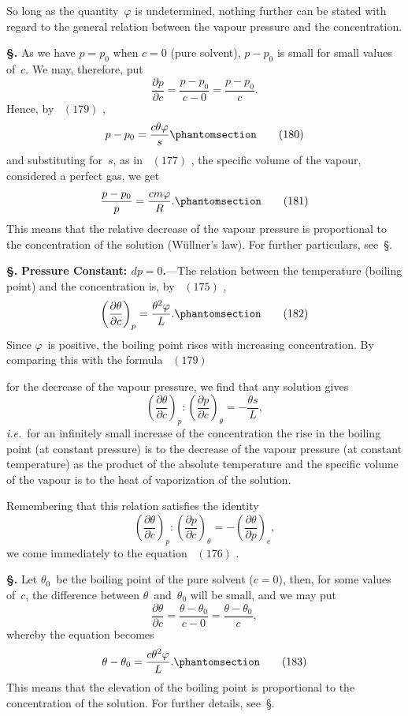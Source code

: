 \documentclass[12pt]{book}[2005/09/16]
\newcommand{\Section}[1]{
  \medskip\par\textbf{§\;#1}
  \label{section:#1}
}
\newcommand{\SecRef}[2][§\;]{\hyperref[section:#2.]{{\upshape #1#2}}}
\newcommand{\Tag}[1]{%
  \phantomsection\label{eqn:#1}\tag*{\ensuremath{#1}}%
}
\newcommand{\Eq}[1]{%
  \hyperref[eqn:#1]{\ensuremath{#1}}%
}
\newcommand{\PageSep}[1]{\ignorespaces}
\newcommand{\Topic}[1]{\textbf{#1}}
\newcommand{\ie}{\emph{i.e.}}
\newcommand{\dd}{\partial}
\begin{document}
So long as the quantity~$\varphi$ is undetermined, nothing
further can be stated with regard to the general relation
between the vapour pressure and the concentration.

\Section{224.} As we have $p = p_{0}$ when $c = 0$ (pure solvent), $p - p_{0}$
%
%
is small for small values of~$c$. We may, therefore, put
\[
\frac{\dd p}{\dd c} = \frac{p - p_{0}}{c - 0} = \frac{p - p_{0}}{c}.
\]
Hence, by~\Eq{(179)},
\[
p - p_{0} = \frac{c\theta\varphi}{s}
\Tag{(180)}
\]
and substituting for~$s$, as in~\Eq{(177)}, the specific volume of
the vapour, considered a perfect gas, we get
\[
\frac{p - p_{0}}{p} = \frac{cm\varphi}{R}.
\Tag{(181)}
\]
This means that the relative decrease of the vapour pressure
is proportional to the concentration of the solution (Wüllner's
law). For further particulars, see~\SecRef{270}.

\Section{225.} \Topic{Pressure Constant: $dp = 0$.}---The relation
\PageSep{200}
between the temperature (boiling point) and the concentration
is, by~\Eq{(175)},
\[
\left(\frac{\dd \theta}{\dd c}\right)_{p} = \frac{\theta^{2} \varphi}{L}.
\Tag{(182)}
\]
Since $\varphi$~is positive, the boiling point rises with increasing
concentration. By comparing this with the formula~\Eq{(179)}
for the decrease of the vapour pressure, we find that any
solution gives
\[
\left(\frac{\dd \theta}{\dd c}\right)_{p} : \left(\frac{\dd p}{\dd c}\right)_{\theta} = -\frac{\theta s}{L},
\]
\ie\ for an infinitely small increase of the concentration the
rise in the boiling point (at constant pressure) is to the
decrease of the vapour pressure (at constant temperature)
as the product of the absolute temperature and the specific
volume of the vapour is to the heat of vaporization of the
solution.

Remembering that this relation satisfies the identity
\[
\left(\frac{\dd \theta}{\dd c}\right)_{p} : \left(\frac{\dd p}{\dd c}\right)_{\theta} = -\left(\frac{\dd \theta}{\dd p}\right)_{c},
\]
we come immediately to the equation~\Eq{(176)}.

\Section{226.} Let $\theta_{0}$~be the boiling point of the pure solvent
%
%
($c = 0$), then, for some values of~$c$, the difference between
$\theta$~and~$\theta_{0}$ will be small, and we may put
\[
\frac{\dd \theta}{\dd c} = \frac{\theta - \theta_{0}}{c - 0} = \frac{\theta - \theta_{0}}{c},
\]
whereby the equation becomes
\[
\theta - \theta_{0} = \frac{c\theta^{2} \varphi}{L}.
\Tag{(183)}
\]
This means that the elevation of the boiling point is proportional
to the concentration of the solution. For further
details, see~\SecRef{269}.
\PageSep{201}
\end{document}
